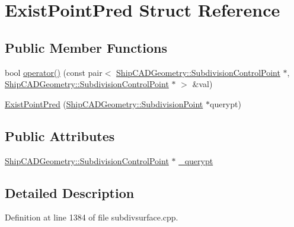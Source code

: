 \hypertarget{structExistPointPred}{\section{Exist\-Point\-Pred Struct Reference}
\label{structExistPointPred}
}
\subsection*{Public Member Functions}
\begin{DoxyCompactItemize}
\item 
bool \hyperlink{structExistPointPred_a74acfe8b1dea23f357f4c02920b0a1a5}{operator()} (const pair$<$ \hyperlink{classShipCADGeometry_1_1SubdivisionControlPoint}{Ship\-C\-A\-D\-Geometry\-::\-Subdivision\-Control\-Point} $\ast$, \hyperlink{classShipCADGeometry_1_1SubdivisionControlPoint}{Ship\-C\-A\-D\-Geometry\-::\-Subdivision\-Control\-Point} $\ast$ $>$ \&val)
\item 
\hyperlink{structExistPointPred_a8f44c5054d426df62113f3965ecc4175}{Exist\-Point\-Pred} (\hyperlink{classShipCADGeometry_1_1SubdivisionPoint}{Ship\-C\-A\-D\-Geometry\-::\-Subdivision\-Point} $\ast$querypt)
\end{DoxyCompactItemize}
\subsection*{Public Attributes}
\begin{DoxyCompactItemize}
\item 
\hyperlink{classShipCADGeometry_1_1SubdivisionControlPoint}{Ship\-C\-A\-D\-Geometry\-::\-Subdivision\-Control\-Point} $\ast$ \hyperlink{structExistPointPred_a359c6d3bff7f508b63f7babe7189a4a1}{\-\_\-querypt}
\end{DoxyCompactItemize}


\subsection{Detailed Description}


Definition at line 1384 of file subdivsurface.\-cpp.



